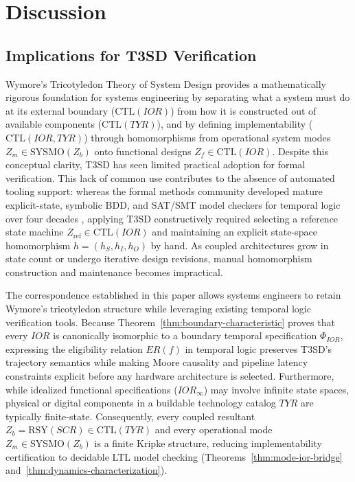 \section{Discussion} \label{sec:discussion}

\subsection{Implications for T3SD Verification}
\label{sec:implications}

Wymore's Tricotyledon Theory of System Design provides a mathematically rigorous foundation for systems engineering by separating what a system must do at its external boundary ($\mathrm{CTL}(IOR)$) from how it is constructed out of available components ($\mathrm{CTL}(TYR)$), and by defining implementability ($\mathrm{CTL}(IOR,TYR)$) through homomorphisms from operational system modes $Z_m\in\mathrm{SYSMO}(Z_b)$ onto functional designs $Z_f\in\mathrm{CTL}(IOR)$. Despite this conceptual clarity, T3SD has seen limited practical adoption for formal verification. This lack of common use contributes to the absence of automated tooling support: whereas the formal methods community developed mature explicit-state, symbolic BDD, and SAT/SMT model checkers for temporal logic over four decades \citep{Pnueli1977,MannaPnueli1995,BiereCimattiClarkeZhu1999,BaierKatoen2008}, applying T3SD constructively required selecting a reference state machine $Z_{\mathrm{ref}}\in\mathrm{CTL}(IOR)$ and maintaining an explicit state-space homomorphism $h=(h_S,h_I,h_O)$ by hand. As coupled architectures grow in state count or undergo iterative design revisions, manual homomorphism construction and maintenance becomes impractical.

The correspondence established in this paper allows systems engineers to retain Wymore's tricotyledon structure while leveraging existing temporal logic verification tools. Because Theorem~\ref{thm:boundary-characteristic} proves that every $IOR$ is canonically isomorphic to a boundary temporal specification $\Phi_{IOR}$, expressing the eligibility relation $ER(f)$ in temporal logic preserves T3SD's trajectory semantics while making Moore causality and pipeline latency constraints explicit before any hardware architecture is selected. Furthermore, while idealized functional specifications ($IOR_\infty$) may involve infinite state spaces, physical or digital components in a buildable technology catalog $TYR$ are typically finite-state. Consequently, every coupled resultant $Z_b=\mathrm{RSY}(SCR)\in\mathrm{CTL}(TYR)$ and every operational mode $Z_m\in\mathrm{SYSMO}(Z_b)$ is a finite Kripke structure, reducing implementability certification to decidable LTL model checking (Theorems~\ref{thm:mode-ior-bridge} and~\ref{thm:dynamics-characterization}).

